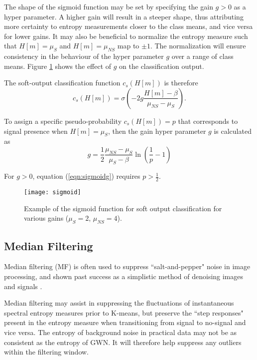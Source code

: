 The shape of the sigmoid function may be set by specifying the gain $g > 0$ as a hyper parameter. A higher gain will result in a steeper shape, thus attributing more certainty to entropy measurements closer to the class means, and vice versa for lower gains. It may also be beneficial to normalize the entropy measure such that $H[m] = \mu_S$ and $H[m] = \mu_{NS}$ map to $\pm1$. The normalization will ensure consistency in the behaviour of the hyper parameter $g$ over a range of class means. Figure \ref{fig:sigmoid} shows the effect of $g$ on the classification output.

The soft-output classification function $c_{s}(H[m])$ is therefore
\begin{equation*}
	c_{s}(H[m]) = \sigma\left(	-2g	\frac{H[m] - \beta}{\mu_{NS} - \mu_S}	\right).
\end{equation*}

To assign a specific pseudo-probability $c_{s}(H[m]) = p$ that corresponds to signal presence when $H[m] = \mu_S$, then the gain hyper parameter $g$ is calculated as
\begin{equation}
	\label{eqn:sigmoidg}
	g = \frac{1}{2} \frac{\mu_{NS} - \mu_S}{\mu_S - \beta} \ln\left(\frac{1}{p} - 1\right)
\end{equation}

For $g>0$, equation (\ref{eqn:sigmoidg}) requires $p > \frac{1}{2}$.

\begin{figure}[!t]
	\centering
	\texttt{[image: sigmoid]}
	\caption{Example of the sigmoid function for soft output classification for various gains ($\mu_S=2$, $\mu_{NS}=4$).}
	\label{fig:sigmoid}
\end{figure}



\subsection{Median Filtering}
Median filtering (MF) is often used to suppress ``salt-and-pepper" noise in image processing, and shown past success as a simplistic method of denoising images and signals \citep{mf1, mf2}.

Median filtering  may assist in suppressing the fluctuations of instantaneous spectral entropy measures prior to K-means, but preserve the ``step responses" present in the entropy measure when transitioning from signal to no-signal and vice versa. The entropy of background noise in practical data may not be as consistent as the entropy of GWN. It will therefore help suppress any outliers within the filtering window.

